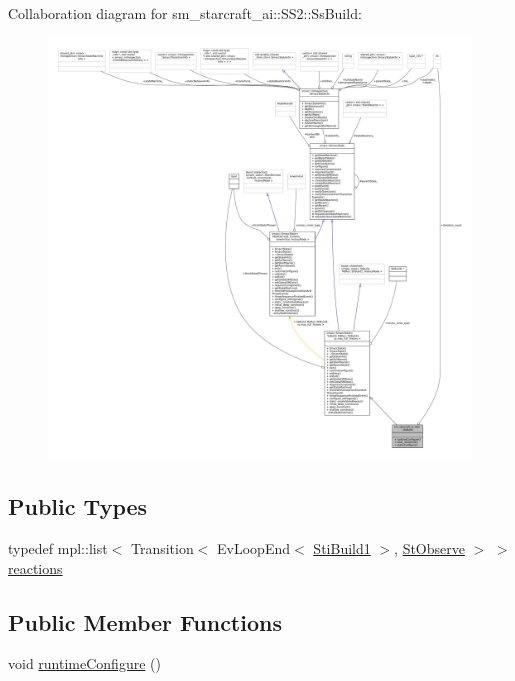 Collaboration diagram for sm\+\_\+starcraft\+\_\+ai\+:\+:S\+S2\+:\+:Ss\+Build\+:
\nopagebreak
\begin{figure}[H]
\begin{center}
\leavevmode
\includegraphics[width=350pt]{structsm__starcraft__ai_1_1SS2_1_1SsBuild__coll__graph}
\end{center}
\end{figure}
\subsection*{Public Types}
\begin{DoxyCompactItemize}
\item 
typedef mpl\+::list$<$ Transition$<$ Ev\+Loop\+End$<$ \hyperlink{structsm__starcraft__ai_1_1build__inner__states_1_1StiBuild1}{Sti\+Build1} $>$, \hyperlink{structsm__starcraft__ai_1_1StObserve}{St\+Observe} $>$ $>$ \hyperlink{structsm__starcraft__ai_1_1SS2_1_1SsBuild_a62244400be4af9006d440fb0f099dcc5}{reactions}
\end{DoxyCompactItemize}
\subsection*{Public Member Functions}
\begin{DoxyCompactItemize}
\item 
void \hyperlink{structsm__starcraft__ai_1_1SS2_1_1SsBuild_ad66cf247c6d12b2700cf87ac8e79a2ee}{runtime\+Configure} ()
\end{DoxyCompactItemize}
